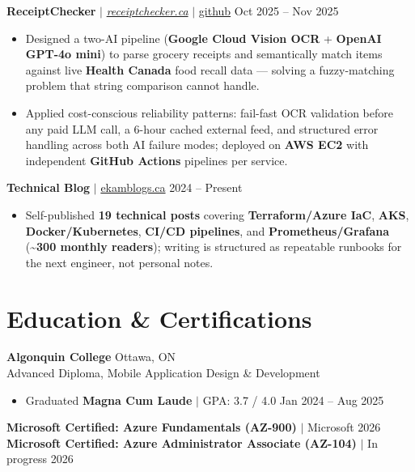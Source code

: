 \documentclass[11pt,a4paper]{article}
\begin{document}
\vspace{4pt}

\textbf{ReceiptChecker} $|$ \href{https://receiptchecker.ca/}{\emph{receiptchecker.ca}} $|$ \href{https://github.com/bhat0155/receipt-check}{\small github} \hfill Oct 2025 -- Nov 2025
\begin{itemize}
    \item Designed a two-AI pipeline (\textbf{Google Cloud Vision OCR} + \textbf{OpenAI GPT-4o mini}) to parse grocery receipts and semantically match items against live \textbf{Health Canada} food recall data — solving a fuzzy-matching problem that string comparison cannot handle.
    \item Applied cost-conscious reliability patterns: fail-fast OCR validation before any paid LLM call, a 6-hour cached external feed, and structured error handling across both AI failure modes; deployed on \textbf{AWS EC2} with independent \textbf{GitHub Actions} pipelines per service.
\end{itemize}

\vspace{4pt}

\textbf{Technical Blog} $|$ \href{https://www.ekamblogs.ca}{ekamblogs.ca} \hfill 2024 -- Present
\begin{itemize}
    \item Self-published \textbf{19 technical posts} covering \textbf{Terraform/Azure IaC}, \textbf{AKS}, \textbf{Docker/Kubernetes}, \textbf{CI/CD pipelines}, and \textbf{Prometheus/Grafana} (\textasciitilde\textbf{300 monthly readers}); writing is structured as repeatable runbooks for the next engineer, not personal notes.
\end{itemize}

\section{Education \& Certifications}

\textbf{Algonquin College} \hfill Ottawa, ON \\
Advanced Diploma, Mobile Application Design \& Development
\begin{itemize}
    \item Graduated \textbf{Magna Cum Laude} $|$ GPA: 3.7 / 4.0 \hfill Jan 2024 -- Aug 2025
\end{itemize}
\textbf{Microsoft Certified: Azure Fundamentals (AZ-900)} $|$ Microsoft \hfill 2026 \\
\textbf{Microsoft Certified: Azure Administrator Associate (AZ-104)} $|$ In progress \hfill 2026
\end{document}
